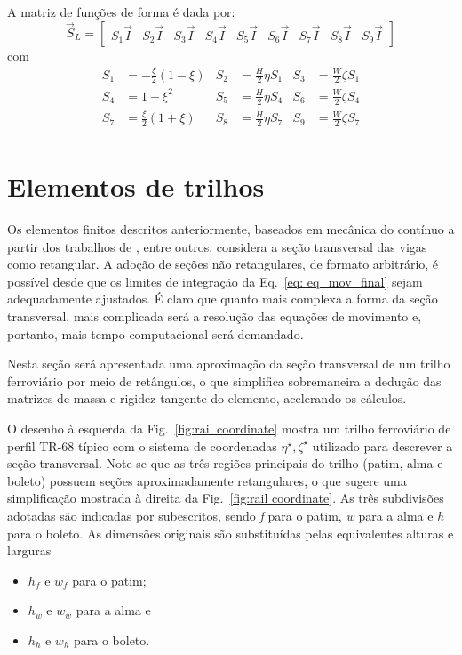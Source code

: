 A matriz de funções de forma é dada por:
\begin{equation}
    \vec{S}_{L} = \begin{bmatrix}
        S_1\vec{I} & S_2\vec{I} & S_3\vec{I} & S_4\vec{I} & S_5\vec{I} & S_6\vec{I} & S_7\vec{I} & S_8\vec{I} & S_9\vec{I}
    \end{bmatrix}    
\end{equation}
com
\begin{align}
    S_1 &= - \frac{\xi}{2}(1-\xi) & S_2 & = \frac{H}{2}\eta S_1 & S_3 & = \frac{W}{2}\zeta S_1 \\
    S_4 &= 1-\xi^2 & S_5 & = \frac{H}{2}\eta S_4 & S_6 & = \frac{W}{2}\zeta S_4 \\
    S_7 &= \frac{\xi}{2}(1+\xi) & S_8 & = \frac{H}{2}\eta S_7 & S_9 & = \frac{W}{2}\zeta S_7 \\
\end{align}



\section{Elementos de trilhos}

Os elementos finitos descritos anteriormente, baseados em mecânica do contínuo a partir dos trabalhos de ,
entre outros, considera a seção transversal das vigas como retangular. A adoção de seções não retangulares, de formato
arbitrário, é possível desde que os limites de integração da Eq.~\eqref{eq: eq_mov_final} sejam adequadamente ajustados.
É claro que quanto mais complexa a forma da seção transversal, mais complicada será a resolução das equações de movimento
e, portanto, mais tempo computacional será demandado.

Nesta seção será apresentada uma aproximação da seção transversal de um trilho ferroviário por meio de retângulos,
o que simplifica sobremaneira a dedução das matrizes de massa e rigidez tangente do elemento, acelerando os cálculos.

O desenho à esquerda da Fig.~\ref{fig:rail coordinate} mostra um trilho ferroviário de perfil TR-68 típico com o sistema de coordenadas $\eta^\star,\zeta^\star$
utilizado para descrever a seção transversal. Note-se que as três regiões principais do trilho (patim, alma e boleto) possuem 
seções aproximadamente retangulares, o que sugere uma simplificação mostrada à direita da Fig.~\ref{fig:rail coordinate}. As três
subdivisões adotadas são indicadas por subescritos, sendo \textit{f} para o patim, \textit{w} para a alma e \textit{h} para o boleto. 
As dimensões originais são substituídas pelas equivalentes alturas e larguras
\begin{itemize}
    \item $h_f$ e $w_f$ para o patim;
    \item $h_w$ e $w_w$ para a alma e
    \item $h_h$ e $w_h$ para o boleto.
\end{itemize}

